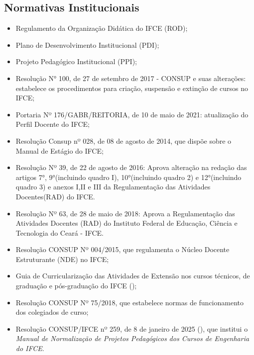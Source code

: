 \subsection{Normativas Institucionais}
%
\begin{itemize}
	\item Regulamento da Organização Didática do IFCE (ROD);
	\item Plano de Desenvolvimento Institucional (PDI);
	\item Projeto Pedagógico Institucional (PPI);
	\item Resolução N° 100, de 27 de setembro de 2017 - CONSUP e suas alterações: estabelece os procedimentos para criação, suspensão e extinção de cursos no IFCE;
	\item Portaria Nº 176/GABR/REITORIA, de 10 de maio de 2021: atualização do Perfil Docente do IFCE;
	\item Resolução Consup nº 028, de 08 de agosto de 2014, que dispõe sobre o Manual de Estágio do IFCE;
	
	\item Resolução Nº 39, de 22 de agosto de 2016: Aprova alteração na redação das artigos 7°, 9°(incluindo quadro I), 10°(incluindo quadro 2) e 12°(incluindo quadro 3) e anexos I,II e III da Regulamentação das Atividades Docentes(RAD) do IFCE.
	
	\item Resolução Nº 63, de 28 de maio de 2018: Aprova a Regulamentação das Atividades Docentes (RAD) do Instituto Federal de Educação, Ciência e Tecnologia do Ceará -
IFCE.
	\item Resolução CONSUP Nº 004/2015, que regulamenta o Núcleo Docente Estruturante (NDE) no IFCE;
	
	\item Guia de Curricularização das Atividades de Extensão nos cursos técnicos, de graduação e pós-graduação do IFCE ();
	
	\item Resolução CONSUP Nº 75/2018, que estabelece normas de funcionamento dos colegiados de curso;
	
	\item Resolução CONSUP/IFCE nº 259, de 8 de janeiro de 2025 (), que institui o \textit{Manual de Normalização de Projetos Pedagógicos dos Cursos de Engenharia do IFCE}.

\end{itemize}

